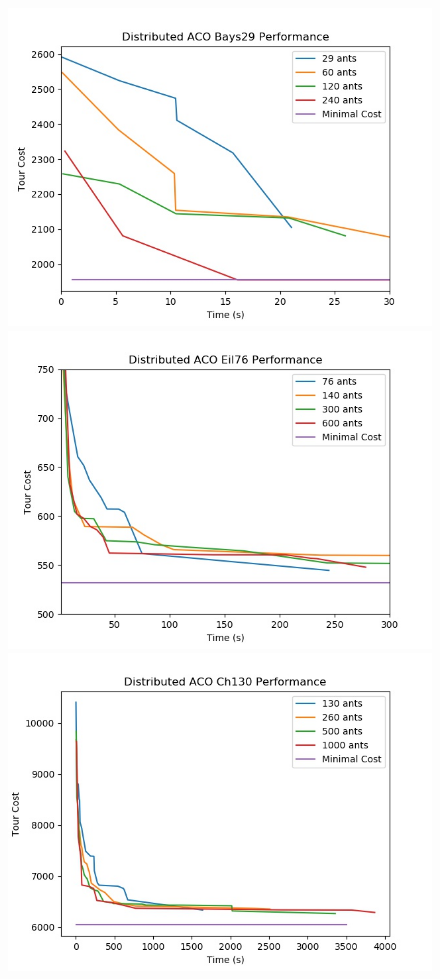 \documentclass[12pt]{article}
\begin{document}
\begin{figure}
    \includegraphics[scale=0.5]{bays29_performance_vs_ants.jpg}
    \includegraphics[scale=0.5]{eil76_performance_vs_ants.jpg}
    \includegraphics[scale=0.5]{ch130_performance_vs_ants.jpg}

\end{figure}
\end{document}
